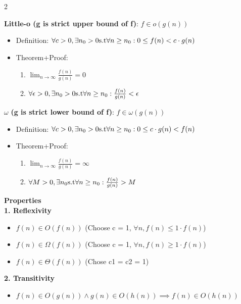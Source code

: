 \documentclass[10pt,landscape]{article}
\begin{document}
\begin{multicols*}{2}
\begin{itemize}
\begin{enumerate}
    \end{enumerate}
\end{itemize}
\vspace{8pt}
\textbf{Little-o (g is strict upper bound of f)}: $f \in o(g(n))$
\begin{itemize}
    \item Definition: $\forall c > 0, \exists n_0 > 0 \space \text{s.t} \space \forall n \geq n_0: 0 \leq f(n)  < c \cdot g(n)$
    \item Theorem+Proof: 
    \begin{enumerate}
        \item $\lim_{n\rightarrow \infty} \frac{f(n)}{g(n)} = 0$
        \item $\forall \epsilon > 0,  \exists n_0 > 0 \space \text{s.t} \space \forall n \geq n_0: \frac{f(n)}{g(n)} < \epsilon$
    \end{enumerate}
\end{itemize}
\vspace{8pt}
$\omega$ \textbf{(g is strict lower bound of f)}: $f \in \omega(g(n))$
\begin{itemize}
    \item Definition: $\forall c > 0, \exists n_0 > 0 \space \text{s.t} \space \forall n \geq n_0: 0 \leq c \cdot g(n) < f(n)$
    \item Theorem+Proof:
    \begin{enumerate}
        \item $\lim_{n\rightarrow \infty} \frac{f(n)}{g(n)} = \infty$
        \item $\forall M > 0, \exists n_0 \space \text{s.t} \space \forall n \geq n_0: \frac{f(n)}{g(n)} > M$
    \end{enumerate}
\end{itemize}
\vspace{8pt}
\textbf{Properties} \\
\textbf{1. Reflexivity}
\begin{itemize}
    \item $f(n) \in O(f(n))$ (Choose c = 1, $\forall n, f(n) \leq 1 \cdot f(n)$)
    \item $f(n) \in \Omega(f(n))$ (Choose c = 1, $\forall n, f(n) \geq 1 \cdot f(n)$)
    \item $f(n) \in \Theta(f(n))$ (Chose c1 = c2 = 1)
\end{itemize}
\vspace{8pt}
\textbf{2. Transitivity}
\begin{itemize}
    \item $f(n) \in O(g(n)) \land g(n) \in O(h(n)) \implies f(n) \in O(h(n))$

\end{itemize}
\end{multicols*}
\end{document}
